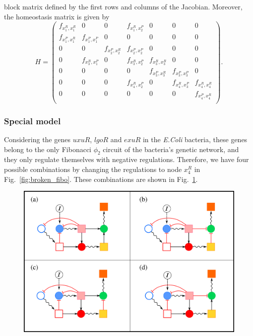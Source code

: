 block matrix defined by the first rows and columns of the Jacobian. 
Moreover, the homeostasis matrix is given by
\begin{equation}
    H = 
    \begin{pmatrix}
        f_{x_1^R,x_1^R} & 0 & 0 & f_{x_1^R, x_2^P} & 0 & 0 & 0 \\
        f_{x_1^P,x_1^R} & f_{x_1^P,x_1^P} & 0 & 0 & 0 & 0 & 0 \\
        0 & 0 & f_{x_2^P,x_2^R} & f_{x_2^P,x_2^P} & 0 & 0 & 0 \\
        0 & f_{x_3^R,x_1^P} & 0 & f_{x_3^R,x_2^P} & f_{x_3^R,x_3^R} & 0 & 0 \\
        0 & 0 & 0 & 0 & f_{x_3^P,x_3^R} & f_{x_3^P,x_3^P} & 0 \\
        0 & 0 & 0 & f_{x_4^R,x_2^P} & 0 & f_{x_4^R,x_3^P} & f_{x_4^R,x_4^R} \\
        0 & 0 & 0 & 0 & 0 & 0 & f_{x_4^P, x_4^R} \\
    \end{pmatrix}.
\end{equation} 

\subsubsection{Special model}

Considering the genes $uxuR$, $lgoR$ and $exuR$ in the 
\textit{E.Coli} bacteria, these genes belong to the only Fibonacci $\phi_2$
circuit of the bacteria's genetic network, and they only regulate 
themselves with negative regulations. Therefore, we have four possible 
combinations by changing the regulations to node $x_4^R$ in 
Fig.~\ref{fig:broken_fibo}. These combinations are shown in 
Fig.~\ref{fig:fibo-combinations}.

\begin{figure}[H]
    \centering
    \includegraphics[scale=0.6]{figs/broken_fibo_mosaic.png}
    \caption{}
    \label{fig:fibo-combinations}
\end{figure}


